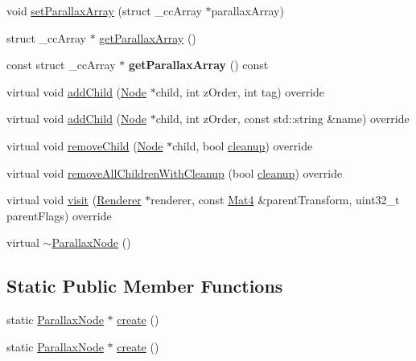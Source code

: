 \begin{DoxyCompactItemize}
\item 
void \hyperlink{classParallaxNode_a6aa28ef360af7ce78e07ef0633da5396}{set\+Parallax\+Array} (struct \+\_\+cc\+Array $\ast$parallax\+Array)
\item 
struct \+\_\+cc\+Array $\ast$ \hyperlink{classParallaxNode_a38cffa76b86e590c2ed9e3b307ea5ee1}{get\+Parallax\+Array} ()
\item 
\mbox{\label{classParallaxNode_a4d3e87281892a340c62aa0df86bc3989}} 
const struct \+\_\+cc\+Array $\ast$ {\bfseries get\+Parallax\+Array} () const
\item 
virtual void \hyperlink{classParallaxNode_a5af09336b4d7f4d25f12d7ddf42a5a9c}{add\+Child} (\hyperlink{classNode}{Node} $\ast$child, int z\+Order, int tag) override
\item 
virtual void \hyperlink{classParallaxNode_a8b6c1d785d253ce586af475763a7afff}{add\+Child} (\hyperlink{classNode}{Node} $\ast$child, int z\+Order, const std\+::string \&name) override
\item 
virtual void \hyperlink{classParallaxNode_a0ce03b1f03d63885b0ffae5a17662f45}{remove\+Child} (\hyperlink{classNode}{Node} $\ast$child, bool \hyperlink{classNode_aa2de84c6cdeec9cd647d236c30ee0567}{cleanup}) override
\item 
virtual void \hyperlink{classParallaxNode_acff596a0ad508105213baddf02cb05e8}{remove\+All\+Children\+With\+Cleanup} (bool \hyperlink{classNode_aa2de84c6cdeec9cd647d236c30ee0567}{cleanup}) override
\item 
virtual void \hyperlink{classParallaxNode_a3e451b09972ed6e158c7b8f88da4b636}{visit} (\hyperlink{classRenderer}{Renderer} $\ast$renderer, const \hyperlink{classMat4}{Mat4} \&parent\+Transform, uint32\+\_\+t parent\+Flags) override
\item 
virtual \hyperlink{classParallaxNode_abf74ce266f988b3efcc1331b23bb14d6}{$\sim$\+Parallax\+Node} ()
\end{DoxyCompactItemize}
\subsection*{Static Public Member Functions}
\begin{DoxyCompactItemize}
\item 
static \hyperlink{classParallaxNode}{Parallax\+Node} $\ast$ \hyperlink{classParallaxNode_a9a6471da1b27afea78f379f894107a39}{create} ()
\item 
static \hyperlink{classParallaxNode}{Parallax\+Node} $\ast$ \hyperlink{classParallaxNode_a7fd50fa157977adc33647922300cc41a}{create} ()
\end{DoxyCompactItemize}
